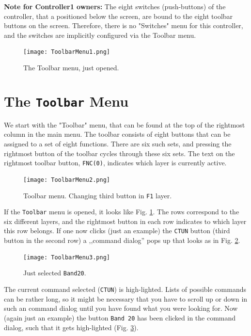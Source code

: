 \documentclass[12pt]{book}
\def\rett#1{\texttt{\color{red}#1}}
\def\bltt#1{\texttt{\color{blue}#1}}
\begin{document}
\textbf{Note for Controller1 owners:} The eight switches (push-buttons) of the controller,
that a positioned below the screen, are bound to the eight toolbar buttons on the screen.
Therefore, there is no "Switches" menu for this controller, and the switches are implicitly
configured via the Toolbar menu.

\begin{figure}[ht]
\center
\texttt{[image: ToolbarMenu1.png]}
\caption{The Toolbar menu, just opened.}
\label{fig:ToolbarMenu1}
\end{figure}

\section{The \texttt{Toolbar} Menu}
\label{sec:toolbarmenu}
We start with the "Toolbar" menu, that can be found at the top of the rightmost
column in the main menu. The toolbar consists of eight buttons that can be assigned
to a set of eight functions. There are six such sets, and pressing the rightmost button
of the toolbar cycles through these six sets. The text on the rightmost toolbar button, \rett{FNC(0)}, indicates which
layer is currently active.

\begin{figure}[ht!]
\center
\texttt{[image: ToolbarMenu2.png]}
\caption{Toolbar menu. Changing third button in \texttt{F1} layer.}
\label{fig:ToolbarMenu2}
\end{figure}

If the \bltt{Toolbar} menu is opened, it looks like Fig. \ref{fig:ToolbarMenu1}.
The rows correspond to the six different layers, and the rightmost button in each
row indicates to which layer this row belongs.
If one now clicks (just an example)
the \texttt{CTUN} button (third button in the second row) a ,,command dialog'' pops up that looks as
in Fig. \ref{fig:ToolbarMenu2}.


\begin{figure}[ht!]
\center
\texttt{[image: ToolbarMenu3.png]}
\caption{Just selected \texttt{Band20}.}
\label{fig:ToolbarMenu3}
\end{figure}

The current command selected (\texttt{CTUN}) is high-lighted. Lists of possible commands can be rather long,
so it might be necessary that you have to scroll up or down in such an command dialog until you have
found what you were looking for. Now (again just an example) the button \texttt{Band 20} has been clicked
in the command dialog, such that it gets high-lighted (Fig. \ref{fig:ToolbarMenu3}).
\end{document}
